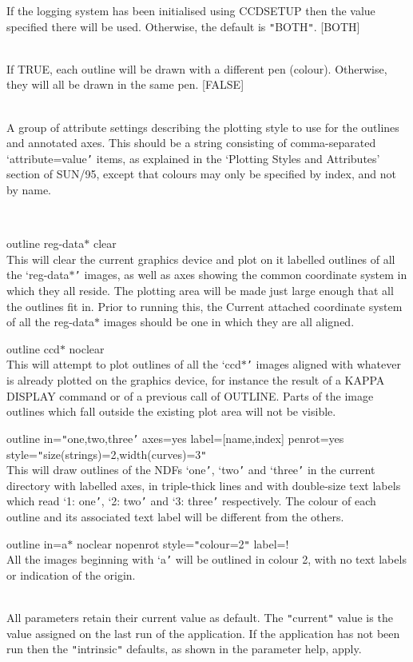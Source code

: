\documentclass[twoside,11pt]{article}
\newcommand{\xref}[3]{#1}
\renewcommand{\_}{\texttt{\symbol{95}}}
\newcommand{\routine}[1]{{\sc #1}}
\newcommand{\sstexamples}[1]{
   \item[Examples:] \mbox{} \\
   \vspace{-3.5ex}
   \begin{description}
      #1
   \end{description}
}
\newcommand{\sstsubsection}[1]{ \item[{#1}] \mbox{} \\}
\newcommand{\sstexamplesubsection}[2]{\sloppy \item{\ssttt #1} \mbox{} \\ #2 }
\newcommand{\sstdiytopic}[2]{\item[#1:] \mbox{} \\[1.3ex] #2}
\newcommand{\sstexamples}[1]{
      \item[Examples:] \\
      \begin{description}
         #1
      \end{description}
      \\
   }
\newcommand{\sstsubsection}[1]{\item[{#1}]}
\newcommand{\sstexamplesubsection}[2]{\item[{\ssttt #1}] #2}
\newcommand{\sstdiytopic}[2]{\item[{#1}] #2 }
\begin{document}
{{{{         }
         If the logging system has been initialised using CCDSETUP
         then the value specified there will be used. Otherwise, the
         default is {\tt "}BOTH{\tt "}.
         [BOTH]
      }
      \sstsubsection{
         PENROT = \_LOGICAL (Read)
      }{
         If TRUE, each outline will be drawn with a different pen
         (colour).  Otherwise, they will all be drawn in the same pen.
         [FALSE]
      }
      \sstsubsection{
         STYLE = LITERAL (Read)
      }{
         A group of attribute settings describing the plotting style
         to use for the outlines and annotated axes.  This should be
         a string consisting of comma-separated `attribute=value{\tt '}
         items, as explained in the `\xref{Plotting Styles and Attributes}{sun95}{se_style}'
         section of \xref{SUN/95}{sun95}{}, except that colours may only be specified
         by index, and not by name.
      }
   }
   \sstexamples{
      \sstexamplesubsection{
         outline reg-data$*$ clear
      }{
         This will clear the current graphics device and plot on it
         labelled outlines of all the `reg-data$*${\tt '} images, as well as
         axes showing the common coordinate system in which they
         all reside.  The plotting area will be made just large enough
         that all the outlines fit in.  Prior to running this, the
         Current attached coordinate system of all the reg-data$*$ images
         should be one in which they are all aligned.
      }
      \sstexamplesubsection{
         outline ccd$*$ noclear
      }{
         This will attempt to plot outlines of all the `ccd$*${\tt '} images
         aligned with whatever is already plotted on the graphics
         device, for instance the result of a KAPPA \xref{DISPLAY}{sun95}{DISPLAY} command
         or of a previous call of \routine{OUTLINE}.  Parts of the image outlines
         which fall outside the existing plot area will not be visible.
      }
      \sstexamplesubsection{
         outline in={\tt "}one,two,three{\tt '} axes=yes label=[name,index] 
                 penrot=yes style={\tt "}size(strings)=2,width(curves)=3{\tt "}
      }{
         This will draw outlines of the NDFs `one{\tt '}, `two{\tt '} and `three{\tt '}
         in the current directory with labelled axes, in triple-thick
         lines and with double-size text labels which read `1: one{\tt '},
         `2: two{\tt '} and `3: three{\tt '} respectively.  The colour of each
         outline and its associated text label will be different from
         the others.
      }
      \sstexamplesubsection{
         outline in=a$*$ noclear nopenrot style={\tt "}colour=2{\tt "} 
                 label=!
      }{
         All the images beginning with `a{\tt '} will be outlined in colour 2,
         with no text labels or indication of the origin.
      }
   }
   \sstdiytopic{
      Behaviour of Parameters
   }{
      All parameters retain their current value as default. The
      {\tt "}current{\tt "} value is the value assigned on the last run of the
      application. If the application has not been run then the
      {\tt "}intrinsic{\tt "} defaults, as shown in the parameter help, apply.

}}
\end{document}

